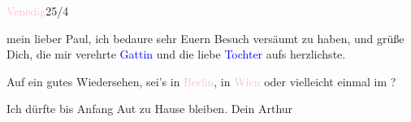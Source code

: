 \pstart
           \raggedleft{}{\pb}\textcolor{pink}{Venedig}{}\ledrightnote{\textcolor{pink}{Venedig}}{ }25/4\pend
           
\pstart
           mein lieber Paul, ich bedaure sehr Euern Besuch versäumt zu haben,
               und grüße Dich, die mir verehrte \textcolor{blue}{Gattin}{}\ledrightnote{{$\rightarrow$}\textcolor{blue}{Eva Marie Goldmann}} und die liebe \textcolor{blue}{Tochter}{}\ledrightnote{{$\rightarrow$}\textcolor{blue}{Franziska Goldmann}} aufs herzlichste.\pend
           
\pstart
           Auf ein gutes Wiedersehen, sei’s in \textcolor{pink}{Berlin}{}\ledrightnote{\textcolor{pink}{Berlin}}, in
                  \textcolor{pink}{Wien}{}\ledrightnote{\textcolor{pink}{Wien}} oder vielleicht einmal im \label{K_L02687-1v}\label{K_L02687-1h}?\pend
           
\pstart
           Ich dürfte bis Anfang Aut zu Hause bleiben.\pend
           \pstart Dein \spacefill\mbox{Arthur}\pend{}\endnumbering{}  
      